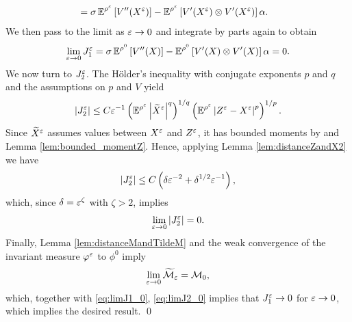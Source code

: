 \documentclass[10pt]{article}
\begin{document}
\begin{appendices}
\begin{equation}
\begin{aligned}
	&= \sigma \operatorname{\mathbb{E}}^{\rho^\varepsilon} \left[ V''(X^\varepsilon) \right] - \operatorname{\mathbb{E}}^{\rho^\varepsilon} \left[ V'(X^\varepsilon) \otimes V'(X^\varepsilon) \right] \alpha.
	\end{aligned}
	\end{equation}
	We then pass to the limit as $\varepsilon \to 0$ and integrate by parts again to obtain
	\begin{equation} \label{eq:limJ1_0}
	\lim_{\varepsilon\to 0} J_1^\varepsilon = \sigma \operatorname{\mathbb{E}}^{\rho^0} \left[ V''(X) \right] - \operatorname{\mathbb{E}}^{\rho^0} \left[ V'(X) \otimes V'(X) \right] \alpha = 0.
	\end{equation}
	We now turn to $J_2^\varepsilon$. The Hölder's inequality with conjugate exponents $p$ and $q$ and the assumptions on $p$ and $V$ yield
	\begin{equation}
	\left\lvert J_2^\varepsilon\right\rvert \le C \varepsilon^{-1} \left( \operatorname{\mathbb{E}}^{\rho^\varepsilon} \left\lvert\widetilde X^\varepsilon\right\rvert^q \right)^{1/q} \left( \operatorname{\mathbb{E}}^{\rho^\varepsilon} \left\lvert Z^\varepsilon - X^\varepsilon\right\rvert^p \right)^{1/p}.
	\end{equation}
	Since $\widetilde X^\varepsilon$ assumes values between $X^\varepsilon$ and $Z^\varepsilon$, it has bounded moments by \cite[Corollary 5.4]{PaS07} and Lemma \ref{lem:bounded_momentZ}. Hence, applying Lemma \ref{lem:distanceZandX2} we have
	\begin{equation} 
	\left\lvert J_2^\varepsilon\right\rvert \le C \left( \delta \varepsilon^{-2} + \delta^{1/2} \varepsilon^{-1} \right),
	\end{equation}
	which, since $\delta = \varepsilon^\zeta$ with $\zeta > 2$, implies
	\begin{equation}\label{eq:limJ2_0}
		\lim_{\varepsilon \to 0} \left\lvert J_2^\varepsilon\right\rvert = 0.
	\end{equation}
	Finally, Lemma \ref{lem:distanceMandTildeM} and the weak convergence of the invariant measure $\varphi^\varepsilon$ to $\phi^0$ imply
	\begin{equation}
	\lim_{\varepsilon \to 0} \widetilde{\mathcal M}_\varepsilon = \mathcal M_0,
	\end{equation}
	which, together with \eqref{eq:limJ1_0}, \eqref{eq:limJ2_0} implies that $J_1^\varepsilon \to 0$ for $\varepsilon \to 0$, which implies the desired result. \qed

\end{appendices}






\end{document}

